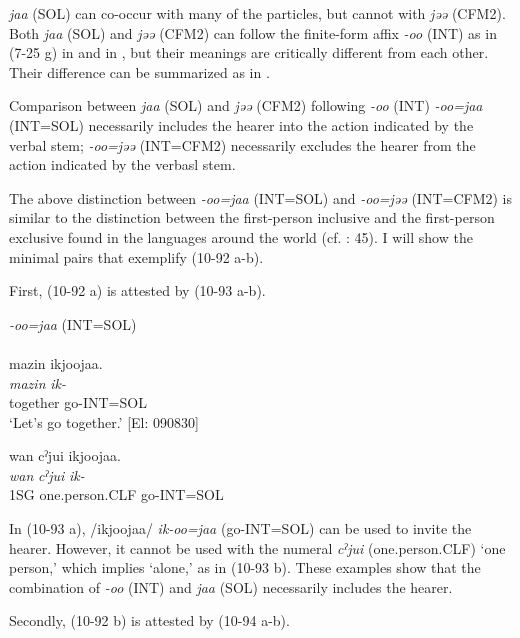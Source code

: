 \textit{jaa} (SOL) can co-occur with many of the particles, but cannot with \textit{jəə} (CFM2). Both \textit{jaa} (SOL) and \textit{jəə} (CFM2) can follow the finite-form affix \textit{-oo} (INT) as in (7-25 g) in  and  in , but their meanings are critically different from each other. Their difference can be summarized as in .

\ea\label{ex:10.92}
Comparison between \textit{jaa} (SOL) and \textit{jəə} (CFM2) following \textit{{}-oo} (INT)
  \ea \textit{{}-oo=jaa} (INT=SOL) necessarily includes the hearer into the action indicated by the verbal stem;
  \ex \textit{{}-oo=jəə} (INT=CFM2) necessarily excludes the hearer from the action indicated by the verbasl stem.
  \z
\z

The above distinction between \textit{{}-oo=jaa} (INT=SOL) and \textit{{}-oo=jəə} (INT=CFM2) is similar to the distinction between the first-person inclusive and the first-person exclusive found in the languages around the world (cf. \citealt{Payne1997}: 45). I will show the minimal pairs that exemplify (10-92 a-b).

First, (10-92 a) is attested by (10-93 a-b).

\ea\label{ex:10.93}   \textit{{}-oo=jaa} (INT=SOL)\\
  \ea{}\\
      \glll     mazin  ikjoojaa.\\
       \textit{mazin}  \textit{ik-}\\
       together  go-INT=SOL\\
      \glt       ‘Let’s go together.’ [El: 090830]

  \ex  %
      \glll    *wan  cˀjui  ikjoojaa.\\
       \textit{wan}  \textit{cˀjui}  \textit{ik-}\\
       1SG  one.person.CLF  go-INT=SOL\\
       \glt    [El: 090830]
    \z
\z

In (10-93 a), /ikjoojaa/ \textit{ik-oo=jaa} (go-INT=SOL) can be used to invite the hearer. However, it cannot be used with the numeral \textit{cˀjui} (one.person.CLF) ‘one person,’ which implies ‘alone,’ as in (10-93 b). These examples show that the combination of \textit{{}-}\textit{oo} (INT) and \textit{jaa} (SOL) necessarily includes the hearer.

Secondly, (10-92 b) is attested by (10-94 a-b).

